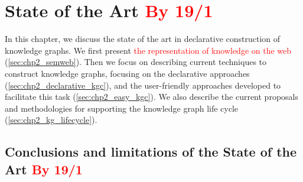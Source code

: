 \chapter{State of the Art \textcolor{red}{By 19/1}}
\label{chapter:sota}

In this chapter, we discuss the state of the art in declarative construction of knowledge graphs. We first present \textcolor{red}{the representation of knowledge on the web} (\cref{sec:chp2_semweb}). Then we focus on describing current techniques to construct knowledge graphs, focusing on the declarative approaches (\cref{sec:chp2_declarative_kgc}), and the user-friendly approaches developed to facilitate this task (\cref{sec:chp2_easy_kgc}). We also describe the current proposals and methodologies for supporting the knowledge graph life cycle  (\cref{sec:chp2_kg_lifecycle}).











\section{Conclusions and limitations of the State of the Art \textcolor{red}{By 19/1}}